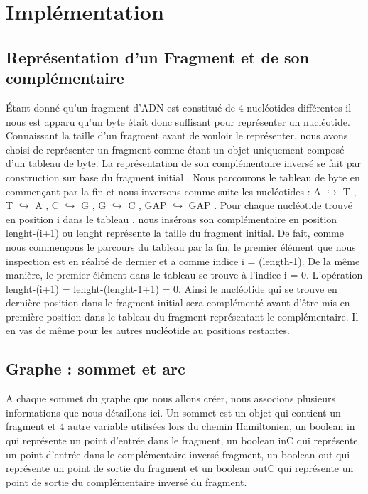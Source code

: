 \documentclass[a4paper]{article}
\begin{document}
\newpage
\section{Implémentation}

\subsection{Représentation d'un Fragment et de son complémentaire}
\'Etant donné qu'un fragment d'ADN est constitué de 4 nucléotides différentes il nous est apparu qu'un byte était donc suffisant pour représenter un nucléotide. Connaissant la taille d'un fragment avant de vouloir le représenter, nous avons choisi de représenter un fragment comme étant un objet uniquement composé d'un tableau de byte. La représentation de son complémentaire inversé se fait par construction sur base du fragment initial . Nous parcourons le tableau de byte en commençant par la fin et nous inversons comme suite les nucléotides : A $\hookrightarrow$ T , T $\hookrightarrow$ A , C $\hookrightarrow$ G , G $\hookrightarrow$ C , GAP $\hookrightarrow$ GAP . Pour chaque nucléotide trouvé en position i dans le tableau , nous insérons son complémentaire en position lenght-(i+1) ou lenght représente la taille du fragment initial. De fait, comme nous commençons le parcours du tableau par la fin, le premier élément que nous inspection est en réalité de dernier et a comme indice i = (length-1). De la même manière, le premier élément dans le tableau se trouve à l'indice i = 0. L'opération  lenght-(i+1) = lenght-(lenght-1+1) =  0. Ainsi le nucléotide qui se trouve en dernière position dans le fragment initial sera complémenté avant d'être mis en première position dans le tableau du fragment représentant le complémentaire. Il en vas de même pour les autres nucléotide au positions restantes.  
\subsection{Graphe : sommet et arc}

A chaque sommet du graphe que nous allons créer, nous associons plusieurs informations que nous détaillons ici. 
Un sommet est un objet qui contient un fragment et 4 autre variable utilisées lors du chemin Hamiltonien, un boolean in qui représente un point d'entrée dans le fragment, un boolean inC qui représente un point d'entrée dans le complémentaire inversé fragment, un boolean out qui représente un point de sortie du fragment et un boolean outC qui représente un point de sortie du complémentaire inversé du fragment. 
\end{document}
